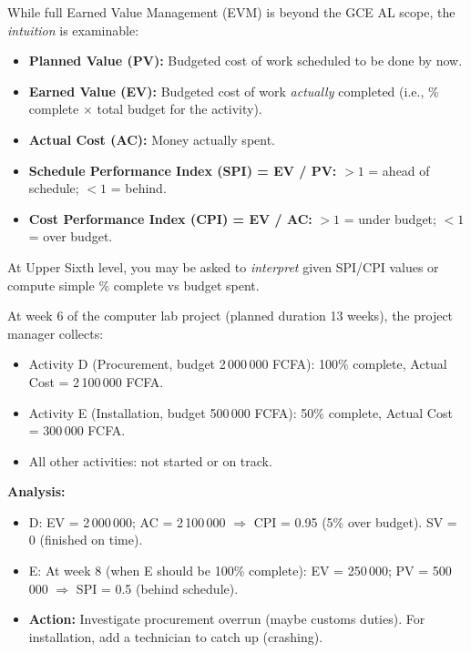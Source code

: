 \documentclass[11pt]{article}
\begin{document}
\begin{definition}
While full Earned Value Management (EVM) is beyond the GCE AL scope, the \emph{intuition} is examinable:
\begin{itemize}
    \item \textbf{Planned Value (PV):} Budgeted cost of work scheduled to be done by now.
    \item \textbf{Earned Value (EV):} Budgeted cost of work \emph{actually} completed (i.e., \% complete $\times$ total budget for the activity).
    \item \textbf{Actual Cost (AC):} Money actually spent.
    \item \textbf{Schedule Performance Index (SPI) = EV / PV:} $>1$ = ahead of schedule; $<1$ = behind.
    \item \textbf{Cost Performance Index (CPI) = EV / AC:} $>1$ = under budget; $<1$ = over budget.
\end{itemize}
At Upper Sixth level, you may be asked to \emph{interpret} given SPI/CPI values or compute simple \% complete vs budget spent.
\end{definition}

\begin{exemplebox}
At week 6 of the computer lab project (planned duration 13 weeks), the project manager collects:
\begin{itemize}
    \item Activity D (Procurement, budget 2\,000\,000 FCFA): 100\% complete, Actual Cost = 2\,100\,000 FCFA.
    \item Activity E (Installation, budget 500\,000 FCFA): 50\% complete, Actual Cost = 300\,000 FCFA.
    \item All other activities: not started or on track.
\end{itemize}
\textbf{Analysis:}
\begin{itemize}
    \item D: EV = 2\,000\,000; AC = 2\,100\,000 $\Rightarrow$ CPI = 0.95 (5\% over budget). SV = 0 (finished on time).
    \item E: At week 8 (when E should be 100\% complete): EV = 250\,000; PV = 500\,000 $\Rightarrow$ SPI = 0.5 (behind schedule).
    \item \textbf{Action:} Investigate procurement overrun (maybe customs duties). For installation, add a technician to catch up (crashing).
\end{itemize}
\end{exemplebox}
\end{document}
